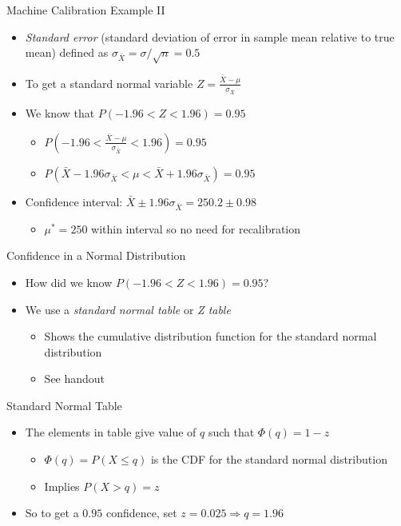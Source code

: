 \documentclass{beamer}
\begin{document}
\begin{frame}{Machine Calibration Example II}  
\begin{itemize} 
 \item \emph{Standard error} (standard deviation of error in sample mean relative to true mean) defined as $\sigma_{\bar{X}} = \sigma/\sqrt{n} = 0.5$ 
 \item To get a standard normal variable $Z = \frac{\bar{X} - \mu}{\sigma_{\bar{X}}}$ 
 \item We know that $P(-1.96 < Z < 1.96) = 0.95$ 
 \begin{itemize}
 \item $P(-1.96 < \frac{\bar{X} - \mu}{\sigma_{\bar{X}}} < 1.96) = 0.95$ 
 \item $P(\bar{X} - 1.96 \sigma_{\bar{X}}  < \mu < \bar{X} + 1.96 \sigma_{\bar{X}}) = 0.95$ 
\end{itemize}
 \item Confidence interval: $\bar{X} \pm 1.96 \sigma_{\bar{X}} = 250.2 \pm 0.98$ 
 \begin{itemize} 
 \item $\mu^* = 250$ within interval so no need for recalibration
 \end{itemize}
\end{itemize}
\end{frame}

\begin{frame}{Confidence in a Normal Distribution}  
\begin{itemize} 
 \item How did we know $P(-1.96 < Z < 1.96) = 0.95$? 
 \item We use a \emph{standard normal table} or \emph{Z table}
 \begin{itemize}
 \item Shows the cumulative distribution function for the standard normal distribution 
 \item See handout 
 \end{itemize} 
\end{itemize}
\end{frame}

\begin{frame}{Standard Normal Table}
\begin{itemize} 
 \item The elements in table give value of $q$ such that $\Phi(q) = 1 - z$ 
 \begin{itemize}
 \item $\Phi(q) = P(X \leq q)$ is the CDF for the standard normal distribution
 \item Implies $P(X > q) = z$
 \end{itemize} 
 \item So to get a $0.95$ confidence, set  $z = 0.025 \Rightarrow q = 1.96$ 
\end{itemize}
\end{frame}
\end{document}
